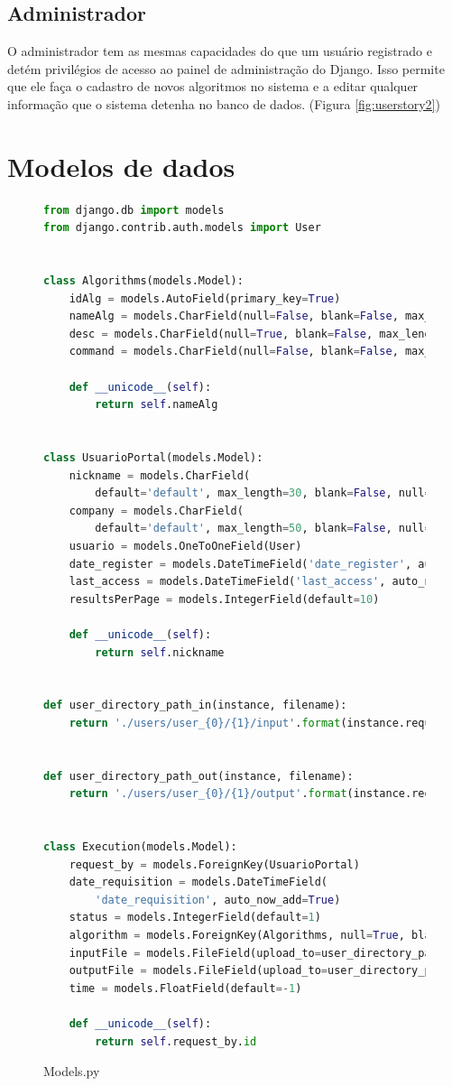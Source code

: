 \documentclass[tg]{mdtufsm}
\begin{document}
\subsection{Administrador}
O administrador tem as mesmas capacidades do que um usuário registrado e detém privilégios de acesso ao painel de administração do Django. Isso permite que ele faça o cadastro de novos algoritmos no sistema e a editar qualquer informação que o sistema detenha no banco de dados. (Figura \ref{fig:userstory2})


\section{Modelos de dados}
\begin{figure}
	\centering
	\begin{minipage}[c]{1\textwidth}
		\begin{lstlisting}[language=Python, frame=single]
from django.db import models
from django.contrib.auth.models import User


class Algorithms(models.Model):
	idAlg = models.AutoField(primary_key=True)
	nameAlg = models.CharField(null=False, blank=False, max_length=100)
	desc = models.CharField(null=True, blank=False, max_length=500)
	command = models.CharField(null=False, blank=False, max_length=100)

	def __unicode__(self):
		return self.nameAlg


class UsuarioPortal(models.Model):
	nickname = models.CharField(
		default='default', max_length=30, blank=False, null=True)
	company = models.CharField(
		default='default', max_length=50, blank=False, null=True)
	usuario = models.OneToOneField(User)
	date_register = models.DateTimeField('date_register', auto_now_add=True)
	last_access = models.DateTimeField('last_access', auto_now=True)
	resultsPerPage = models.IntegerField(default=10)

	def __unicode__(self):
		return self.nickname


def user_directory_path_in(instance, filename):
	return './users/user_{0}/{1}/input'.format(instance.request_by.usuario.id, instance.id)


def user_directory_path_out(instance, filename):
	return './users/user_{0}/{1}/output'.format(instance.request_by.usuario.id, instance.id)


class Execution(models.Model):
	request_by = models.ForeignKey(UsuarioPortal)
	date_requisition = models.DateTimeField(
		'date_requisition', auto_now_add=True)
	status = models.IntegerField(default=1)
	algorithm = models.ForeignKey(Algorithms, null=True, blank=False)
	inputFile = models.FileField(upload_to=user_directory_path_in, null=True)
	outputFile = models.FileField(upload_to=user_directory_path_out, null=True)
	time = models.FloatField(default=-1)
	
	def __unicode__(self):
		return self.request_by.id
		\end{lstlisting}
		\clearpage
		\caption{
			Models.py
		}
		\label{fig:modelo}
	\end{minipage}
\end{figure}
\end{document}
